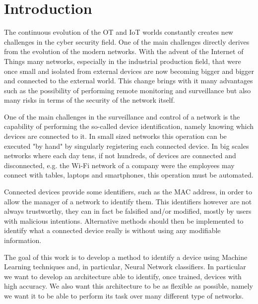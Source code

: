 \chapter{Introduction}

The continuous evolution of the OT and IoT worlds constantly creates new challenges in the cyber security field. One of the main challenges directly derives from the evolution of the modern networks. With the advent of the Internet of Things many networks, especially in the industrial production field, that were once small and isolated from external devices are now becoming bigger and bigger and connected to the external world. This change brings with it many advantages such as the possibility of performing remote monitoring and surveillance but also many risks in terms of the security of the network itself.

One of the main challenges in the surveillance and control of a network is the capability of performing the so-called device identification, namely knowing which devices are connected to it. In small sized networks this operation can be executed "by hand" by singularly registering each connected device. In big scales networks where each day tens, if not hundreds, of devices are connected and disconnected, e.g. the Wi-Fi network of a company were the employees may connect with tables, laptops and smartphones, this operation must be automated. 

Connected devices provide some identifiers, such as the MAC address, in order to allow the manager of a network to identify them. This identifiers however are not always trustworthy, they can in fact be falsified and/or modified, mostly by users with malicious intentions. Alternative methods should then be implemented to identify what a connected device really is without using any modifiable information.

The goal of this work is to develop a method to identify a device using Machine Learning techniques and, in particular, Neural Network classifiers. In particular we want to develop an architecture able to identify, once trained, devices with high accuracy. We also want this architecture to be as flexible as possible, namely we want it to be able to perform its task over many different type of networks. 